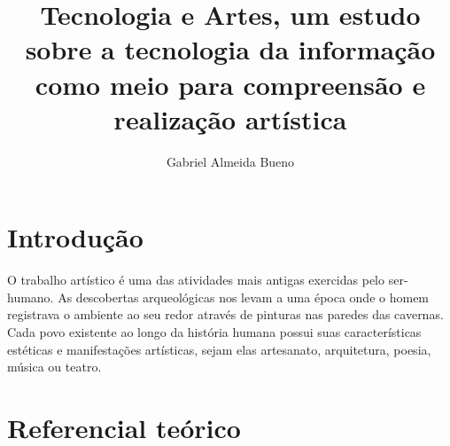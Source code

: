 \documentclass[12pt, a4paper, titlepage]{article}
\author{Gabriel Almeida Bueno}
\affil{FATEC Zona Sul}
\title{Tecnologia e Artes, um estudo sobre a tecnologia da informação como meio para compreensão e realização artística}
\begin{document}
\maketitle

\section{Introdução}
O trabalho artístico é uma das atividades mais antigas exercidas pelo ser-humano. As descobertas
arqueológicas nos levam a uma época onde o homem registrava o ambiente ao seu redor através de pinturas nas paredes
das cavernas. Cada povo existente ao longo da história humana possui suas características estéticas e manifestações artísticas, 
sejam elas artesanato, arquitetura, poesia, música ou teatro. 


\section{Referencial teórico}

\printbibliography
\end{document}
